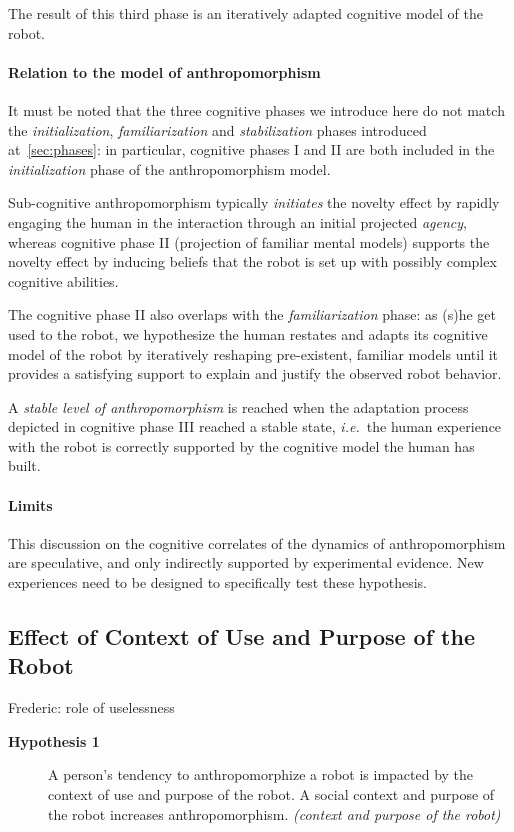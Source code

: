 \documentclass[lettersize, apacite, twoside, HRI]{apa_HRI}
\newcommand{\ie}{{\textit{i.e.~}}}
\begin{document}
The result of this third phase is an iteratively adapted cognitive model of the
robot.

\paragraph{Relation to the model of anthropomorphism} It must be noted that the
three cognitive phases we introduce here do not match the
\emph{initialization}, \emph{familiarization} and \emph{stabilization} phases
introduced at~\ref{sec:phases}: in particular, cognitive phases I and II are
both included in the \emph{initialization} phase of the anthropomorphism model.

Sub-cognitive anthropomorphism typically \emph{initiates} the novelty effect by
rapidly engaging the human in the interaction through an initial projected
\emph{agency}, whereas cognitive phase II (projection of familiar mental
models) supports the novelty effect by inducing beliefs that the robot is set
up with possibly complex cognitive abilities.

The cognitive phase II also overlaps with the \emph{familiarization} phase: as
(s)he get used to the robot, we hypothesize the human restates and adapts its
cognitive model of the robot by iteratively reshaping pre-existent, familiar
models until it provides a satisfying support to explain and justify the
observed robot behavior.

A \emph{stable level of anthropomorphism} is reached when the adaptation
process depicted in cognitive phase III reached a stable state, \ie the human
experience with the robot is correctly supported by the cognitive model the
human has built.

\paragraph{Limits} This discussion on the cognitive correlates of the dynamics
of anthropomorphism are speculative, and only indirectly supported by
experimental evidence. New experiences need to be designed to specifically test
these hypothesis.

\subsection{Effect of Context of Use and Purpose of the Robot}
\label{sec:8.1}
Frederic: role of uselessness


\begin{description}
	\item[\textbf{Hypothesis 1}] A person's tendency to anthropomorphize a robot is impacted by the context of use and purpose of the robot. A social context and purpose of the robot increases anthropomorphism. \textit{(context and purpose of the robot)}
\end{description}
\end{document}
